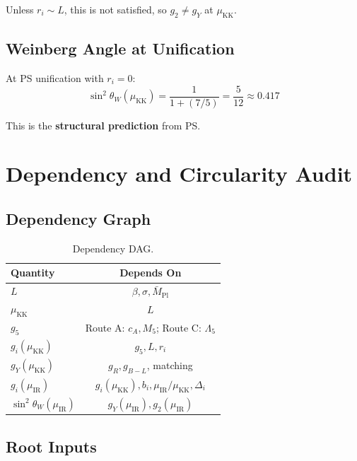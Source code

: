 \documentclass[11pt,a4paper]{article}
\begin{document}
Unless $r_i \sim L$, this is not satisfied, so $g_2 \neq g_Y$ at $\mu_{\text{KK}}$.

\subsection{Weinberg Angle at Unification}
\label{subsec:weinberg-unif}

At PS unification with $r_i = 0$:
\begin{equation}
\label{eq:sin2-unif}
\sin^2\theta_W(\mu_{\text{KK}}) = \frac{1}{1 + (7/5)} = \frac{5}{12} \approx 0.417
\end{equation}

This is the \textbf{structural prediction} from PS.

\section{Dependency and Circularity Audit}
\label{sec:dependency}

\subsection{Dependency Graph}
\label{subsec:dep-graph}

\begin{table}[ht]
\centering
\caption{Dependency DAG.}
\label{tab:dep-dag}
\begin{tabular}{lc}
\toprule
\textbf{Quantity} & \textbf{Depends On} \\
\midrule
$L$ & $\beta, \sigma, \bar{M}_{\text{Pl}}$ \\
$\mu_{\text{KK}}$ & $L$ \\
$g_5$ & Route A: $c_A, M_5$; Route C: $\Lambda_5$ \\
$g_i(\mu_{\text{KK}})$ & $g_5, L, r_i$ \\
$g_Y(\mu_{\text{KK}})$ & $g_R, g_{B-L}$, matching \\
$g_i(\mu_{\text{IR}})$ & $g_i(\mu_{\text{KK}}), b_i, \mu_{\text{IR}}/\mu_{\text{KK}}, \Delta_i$ \\
$\sin^2\theta_W(\mu_{\text{IR}})$ & $g_Y(\mu_{\text{IR}}), g_2(\mu_{\text{IR}})$ \\
\bottomrule
\end{tabular}
\end{table}

\subsection{Root Inputs}
\label{subsec:roots}
\end{document}

